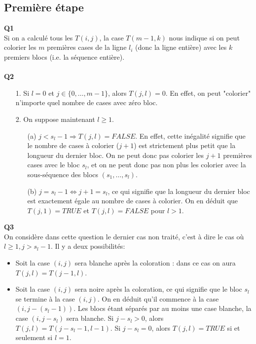 \documentclass[10pt,a4paper]{article}
\begin{document}
\subsection{Première étape}
\noindent \textbf{Q1} \\
Si on a calculé tous les $T(i,j)$, la case $T(m-1, k)$ nous indique si on peut colorier les $m$ premières cases de la ligne $l_i$ (donc la ligne entière) avec les $k$ premiers blocs (i.e. la séquence entière). \\ \\
\noindent \textbf{Q2}
\begin{itemize}
\item[1.] Si $l = 0$ et $j \in \lbrace 0, \hdots, m-1 \rbrace$, alors $T(j,l) = 0$. En effet, on peut "colorier" n'importe quel nombre de cases avec zéro bloc. \\ 
\item[2.] On suppose maintenant $l \geq 1$.
	\begin{itemize}
		\item[(a)] $j < s_l -1 \Rightarrow T(j,l) = FALSE$. En effet, cette inégalité signifie que le nombre de cases à colorier ($j+1$) est strictement plus petit que la longueur du dernier bloc. On ne peut donc pas colorier les $j+1$ premières cases avec le bloc $s_l$, et on ne peut donc pas non plus les colorier avec la sous-séquence des blocs $(s_1, \hdots, s_l)$. 
		\item[(b)] $j = s_l -1 \Leftrightarrow j+1 = s_l$, ce qui signifie que la longueur du dernier bloc est exactement égale au nombre de cases à colorier. On en déduit que $T(j,1) = TRUE$ et $T(j,l) = FALSE$ pour $l > 1$. 
	\end{itemize}
\end{itemize}
\noindent
\textbf{Q3} \\
On considère dans cette question le dernier cas non traité, c'est à dire le cas où $l \geq 1, j > s_l -1$. Il y a deux possibilités: 
\begin{itemize}
	\item Soit la case $(i,j)$ sera blanche après la coloration : dans ce cas on aura $T(j,l) = T(j-1,l)$. 
	\item Soit la case $(i,j)$ sera noire après la coloration, ce qui signifie que le bloc $s_l$ se termine à la case $(i,j)$. On en déduit qu'il commence à la case $(i, j - (s_l -1))$. Les blocs étant séparés par au moins une case blanche, la case $(i, j-s_l)$ sera blanche. Si $j-s_l > 0$, alors $T(j, l) = T(j-s_l -1, l-1)$. Si $j-s_l = 0$, alors $T(j,l) = TRUE$ si et seulement si $l = 1$.  
\end{itemize}  
\end{document}
